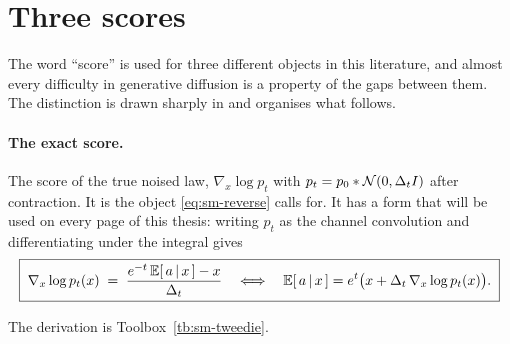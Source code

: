 \section{Three scores}
\label{sec:sm-three-scores}\label{sec:tweedie}

The word ``score'' is used for three different objects in this literature, and
almost every difficulty in generative diffusion is a property of the gaps
between them. The distinction is drawn sharply in \citet{biroli2023generative}
and organises what follows.

\paragraph{The exact score.} The score of the true noised law,
$\nabla_x \log p_t$ with $p_t = p_0 * \mathcal{N}(0,\Delta_t I)$ after contraction. It is
the object \eqref{eq:sm-reverse} calls for. It has a form that will be used on
every page of this thesis: writing $p_t$ as the channel convolution and
differentiating under the integral gives
\begin{equation}
  \boxed{\;
  \nabla_x \log p_t(x)
  \;=\; \frac{e^{-t}\,\mathbb{E}[\,a \,|\, x\,] - x}{\Delta_t}
  \quad\Longleftrightarrow\quad
  \mathbb{E}[\,a \,|\, x\,]
  = e^{t}\big( x + \Delta_t\, \nabla_x \log p_t(x) \big).
  \;}
  \label{eq:tweedie}
\end{equation}

\noindent The derivation is Toolbox~\ref{tb:sm-tweedie}.

